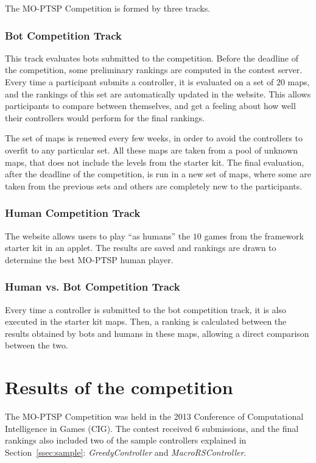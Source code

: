 \documentclass[conference]{IEEEtran}
\begin{document}
The MO-PTSP Competition is formed by three tracks.

\subsubsection{Bot Competition Track} This track evaluates bots submitted to the competition. Before the deadline of the competition, some preliminary rankings are computed in the contest server. Every time a participant submits a controller, it is evaluated on a set of $20$ maps, and the rankings of this set are automatically updated in the website. This allows participants to compare between themselves, and get a feeling about how well their controllers would perform for the final rankings.

The set of maps is renewed every few weeks, in order to avoid the controllers to overfit to any particular set. All these maps are taken from a pool of unknown maps, that does not include the levels from the starter kit. The final evaluation, after the deadline of the competition, is run in a new set of maps, where some are taken from the previous sets and others are completely new to the participants.

\subsubsection{Human Competition Track} The website allows users to play ``as humans'' the $10$ games from the framework starter kit in an applet. The results are saved and rankings are drawn to determine the best MO-PTSP human player.

\subsubsection{Human vs. Bot Competition Track} Every time a controller is submitted to the bot competition track, it is also executed in the starter kit maps. Then, a ranking is calculated between the results obtained by bots and humans in these maps, allowing a direct comparison between the two.

\section{Results of the competition} \label{sec:res}

The MO-PTSP Competition was held in the 2013  Conference of Computational Intelligence in Games (CIG). The contest received $6$ submissions, and the final rankings also included two of the sample controllers explained in Section~\ref{ssec:sample}: \textit{GreedyController} and \textit{MacroRSController}.
\end{document}
